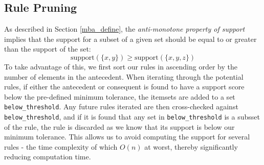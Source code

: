 \subsection{Rule Pruning}
As described in Section \ref{mba_define}, the \textit{anti-monotone property of support} implies that the support for a subset of a given set should be equal to or greater than the support of the set: \[\text{support}(\{x,y\}) \geq \text{support}(\{x,y,z\})\]
To take advantage of this, we first sort our rules in ascending order by the number of elements in the antecedent. When iterating through the potential rules, if either the antecedent or consequent is found to have a support score below the pre-defined minimum tolerance, the itemsets are added to a set \texttt{below\_threshold}. Any future rules iterated are then cross-checked against \texttt{below\_threshold}, 
and if it is found that any set in \texttt{below\_threshold} is a subsset of the rule, the rule is discarded as we know that its support is below our minimum tolerance. This allows us to avoid computing the support for several rules - the time complexity of which $O(n)$ at worst, thereby significantly reducing computation time.
